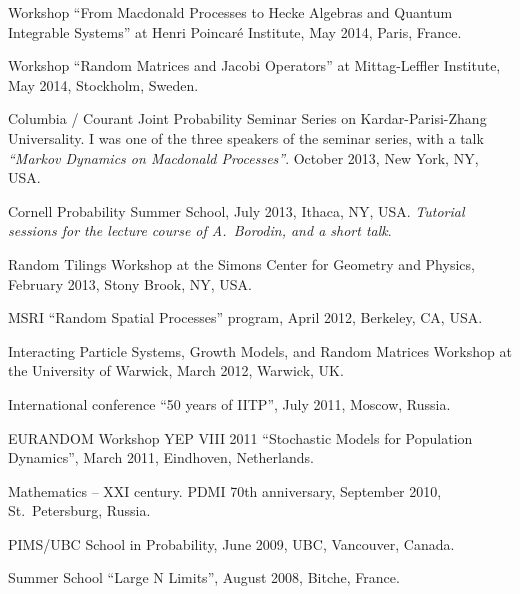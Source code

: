 \documentclass[letterpaper,11pt]{article}
\begin{document}
\begin{etaremune}
	\item
	      Workshop ``From Macdonald Processes to Hecke Algebras and
	      Quantum Integrable Systems'' at Henri Poincar\'e Institute, May 2014, Paris,
	      France.

	\item
	      Workshop ``Random Matrices and Jacobi Operators'' at
	      Mittag-Leffler Institute, May 2014, Stockholm, Sweden.

	\item
	      Columbia / Courant Joint Probability Seminar Series on
	      Kardar-Parisi-Zhang Universality. I was one of the three speakers of the
	      seminar series, with a talk \emph{``Markov Dynamics on Macdonald Processes''}.
	      October 2013, New York, NY, USA.

	\item
	      Cornell Probability Summer School, July 2013, Ithaca, NY, USA.
	      \emph{Tutorial sessions for the lecture course of A.~Borodin, and a short
		      talk}.

	\item
	      Random Tilings Workshop at the Simons Center for Geometry and
	      Physics, February 2013, Stony Brook, NY, USA.

	\item
	      MSRI ``Random Spatial Processes'' program, April 2012, Berkeley,
	      CA, USA.

	\item
	      Interacting Particle Systems, Growth Models, and Random Matrices
	      Workshop at the University of Warwick, March 2012, Warwick, UK.

	\item
	      International conference ``50 years of IITP'', July 2011,
	      Moscow, Russia.

	\item
	      EURANDOM Workshop YEP VIII 2011 ``Stochastic Models for
	      Population Dynamics'', March 2011, Eindhoven, Netherlands.

	\item
	      Mathematics -- XXI century. PDMI 70th anniversary, September
	      2010, St.~Petersburg, Russia.

	\item
	      PIMS/UBC School in Probability, June 2009, UBC, Vancouver,
	      Canada.

	\item
	      Summer School ``Large N Limits'', August 2008, Bitche, France.
\end{etaremune}
\end{document}
